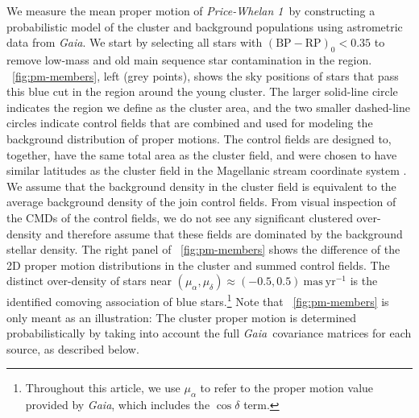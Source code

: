 \documentclass[twocolumn]{aastex62}
\newcommand{\gaia}{\textsl{Gaia}}
\newcommand{\masyr}{\ensuremath{\textrm{mas}~\textrm{yr}^{-1}}}
\newcommand{\clustername}{\textsl{Price-Whelan 1}}
\newcommand{\bprp}{\ensuremath{\textrm{BP} - \textrm{RP}}}
\begin{document}
We measure the mean proper motion of \clustername\ by constructing a probabilistic model of the cluster and background populations using astrometric data from \gaia.
We start by selecting all stars with $(\bprp)_0 < 0.35$ to remove low-mass and old main sequence star contamination in the region.
\figurename~\ref{fig:pm-members}, left (grey points), shows the sky positions of stars that pass this blue cut in the region around the young cluster.
The larger solid-line circle indicates the region we define as the cluster area, and the two smaller dashed-line circles indicate control fields that are combined and used for modeling the background distribution of proper motions.
The control fields are designed to, together, have the same total area as the cluster field, and were chosen to have similar latitudes as the cluster field in the Magellanic stream coordinate system \citep{Nidever:2008}.
We assume that the background density in the cluster field is equivalent to the average background density of the join control fields.
From visual inspection of the CMDs of the control fields, we do not see any significant clustered over-density and therefore assume that these fields are dominated by the background stellar density.
The right panel of \figurename~\ref{fig:pm-members} shows the difference of the 2D proper motion distributions in the cluster and summed control fields.
The distinct over-density of stars near $(\mu_\alpha, \mu_\delta) \approx (-0.5, 0.5)~\masyr$ is the identified comoving association of blue stars.\footnote{Throughout this article, we use $\mu_\alpha$ to refer to the proper motion value provided by \gaia, which includes the $\cos\delta$ term.}
Note that \figurename~\ref{fig:pm-members} is only meant as an illustration: The cluster proper motion is determined probabilistically by taking into account the full \gaia\ covariance matrices for each source, as described below.
\end{document}
